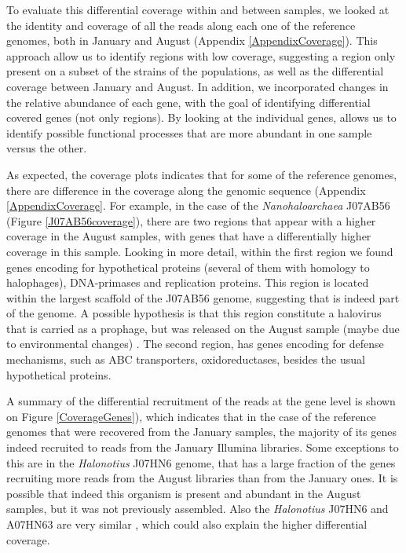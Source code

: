 To evaluate this differential coverage within and between samples, we looked at the identity and coverage of all the reads along each one of the reference genomes, both in January and August (Appendix \ref{AppendixCoverage}). This approach allow us to identify regions with low coverage, suggesting a region only present on a subset of the strains of the populations, as well as the differential coverage between January and August. In addition, we incorporated changes in the relative abundance of each gene, with the goal of identifying differential covered genes (not only regions). By looking at the individual genes, allows us to identify possible functional processes that are more abundant in one sample versus the other.

As expected, the coverage plots indicates that for some of the reference genomes, there are difference in the coverage along the genomic sequence (Appendix \ref{AppendixCoverage}. For example, in the case of the \textit{Nanohaloarchaea} J07AB56 (Figure \ref{J07AB56coverage}), there are two regions that appear with a higher coverage in the August samples, with genes that have a differentially higher coverage in this sample. Looking in more detail, within the first region we found genes encoding for hypothetical proteins (several of them with homology to halophages), DNA-primases and replication proteins. This region is located within the largest scaffold of the J07AB56 genome, suggesting that is indeed part of the genome. A possible hypothesis is that this region constitute a halovirus that is carried as a prophage, but was released on the August sample (maybe due to environmental changes) \cite{Porter:2007jw}. The second region, has genes encoding for defense mechanisms, such as ABC transporters, oxidoreductases, besides the usual hypothetical proteins.

A summary of the differential recruitment of the reads at the gene level is shown on Figure \ref{CoverageGenes}), which indicates that in the case of the reference genomes that were recovered from the January samples, the majority of its genes indeed recruited to reads from the January Illumina libraries. Some exceptions to this are in the \textit{Halonotius} J07HN6 genome, that has a large fraction of the genes recruiting more reads from the August libraries than from the January ones. It is possible that indeed this organism is present and abundant in the August samples, but it was not previously assembled. Also the \textit{Halonotius} J07HN6 and A07HN63 are very similar \cite{Podell:2013fp}, which could also explain the higher differential coverage.

